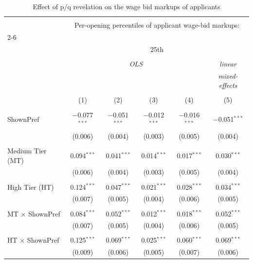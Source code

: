 
\begin{table}[!htbp] \centering 
  \caption{Effect of p/q revelation on the wage bid markups of applicants} 
  \label{tab:markups} 
\begin{tabular}{@{\extracolsep{5pt}}lccccc} 
\\[-1.8ex]\hline 
\hline \\[-1.8ex] 
 & \multicolumn{5}{c}{Per-opening percentiles of applicant wage-bid markups:} \\ 
\cline{2-6} 
\\[-1.8ex] & \multicolumn{5}{c}{25th} \\ 
\\[-1.8ex] & \multicolumn{4}{c}{\textit{OLS}} & \textit{linear} \\ 
 & \multicolumn{4}{c}{\textit{}} & \textit{mixed-effects} \\ 
\\[-1.8ex] & (1) & (2) & (3) & (4) & (5)\\ 
\hline \\[-1.8ex] 
 ShownPref & $-$0.077$^{***}$ & $-$0.051$^{***}$ & $-$0.012$^{***}$ & $-$0.016$^{***}$ & $-$0.051$^{***}$ \\ 
  & (0.006) & (0.004) & (0.003) & (0.005) & (0.004) \\ 
  & & & & & \\ 
 Medium Tier (MT) & 0.094$^{***}$ & 0.041$^{***}$ & 0.014$^{***}$ & 0.017$^{***}$ & 0.030$^{***}$ \\ 
  & (0.006) & (0.004) & (0.003) & (0.005) & (0.004) \\ 
  & & & & & \\ 
 High Tier (HT) & 0.124$^{***}$ & 0.047$^{***}$ & 0.021$^{***}$ & 0.028$^{***}$ & 0.034$^{***}$ \\ 
  & (0.007) & (0.005) & (0.004) & (0.006) & (0.005) \\ 
  & & & & & \\ 
 MT $\times$ ShownPref & 0.084$^{***}$ & 0.052$^{***}$ & 0.012$^{***}$ & 0.018$^{***}$ & 0.052$^{***}$ \\ 
  & (0.007) & (0.005) & (0.004) & (0.006) & (0.005) \\ 
  & & & & & \\ 
 HT $\times$ ShownPref & 0.125$^{***}$ & 0.069$^{***}$ & 0.025$^{***}$ & 0.060$^{***}$ & 0.069$^{***}$ \\ 
  & (0.009) & (0.006) & (0.005) & (0.007) & (0.006) \\ 

\end{tabular}
\end{table}
